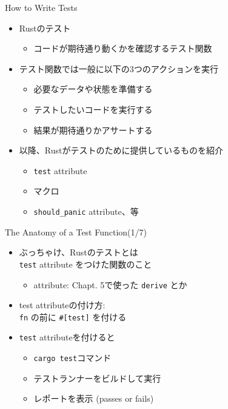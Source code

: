 \documentclass[cjk,14pt,xcolor=dvipsnames,table,dvipdfmx,professional font,t,fragile]{beamer}
\begin{document}
\begin{frame}{How to Write Tests}
 \begin{itemize}
  \item Rustのテスト
	\begin{itemize}
	 \item コードが期待通り動くかを確認するテスト関数
	\end{itemize}
  \item テスト関数では一般に以下の3つのアクションを実行
	\begin{itemize}
	 \item 必要なデータや状態を準備する
	 \item テストしたいコードを実行する
	 \item 結果が期待通りかアサートする
	\end{itemize}
  \item 以降、Rustがテストのために提供しているものを紹介
	\begin{itemize}
	 \item \texttt{test} attribute
	 \item マクロ
	 \item \texttt{should\_panic} attribute、等
	\end{itemize}
 \end{itemize}
\end{frame}

\begin{frame}[containsverbatim]{The Anatomy of a Test Function(1/7)}
 \begin{itemize}
  \item ぶっちゃけ、Rustのテストとは\\
	\texttt{test} attribute をつけた関数のこと
	\begin{itemize}
	 \item attribute: Chapt. 5で使った \texttt{derive} とか
	\end{itemize}
  \item test attributeの付け方: \\
	\hspace{2zw} \texttt{fn} の前に \verb|#[test]| を付ける
  \item \texttt{test} attributeを付けると
	\begin{itemize}
	 \item \texttt{cargo test}コマンド
	 \item テストランナーをビルドして実行
	 \item レポートを表示 (passes or fails)
	\end{itemize}
 \end{itemize}
\end{frame}
\end{document}
